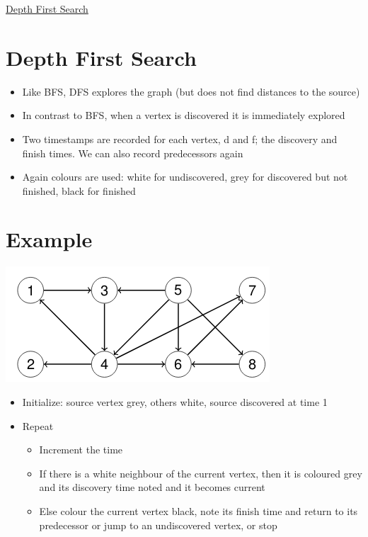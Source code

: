 \documentclass{article}[18pt]
\begin{document}
\begin{center}
\underline{\huge Depth First Search}
\end{center}
\section{Depth First Search}
\begin{itemize}
	\item Like BFS, DFS explores the graph (but does not find distances to the source)
	\item In contrast to BFS, when a vertex is discovered it is immediately explored
	\item Two timestamps are recorded for each vertex, d and f; the discovery and finish times. We can also record predecessors again
	\item Again colours are used: white for undiscovered, grey for discovered but not finished, black for finished
\end{itemize}
\section{Example}
\begin{center}
	\includegraphics[scale=0.7]{Example}
\end{center}
\begin{itemize}
	\item Initialize: source vertex grey, others white, source discovered at time 1
	\item Repeat
	\begin{itemize}
		\item Increment the time
		\item If there is a white neighbour of the current vertex, then it is coloured grey and its discovery time noted and it becomes current
		\item Else colour the current vertex black, note its finish time and return to its predecessor or jump to an undiscovered vertex, or stop
	\end{itemize}
\end{itemize}
\end{document}
